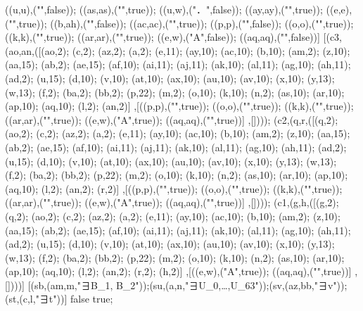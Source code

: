 ((u,u),("\mrot{\iterstar{i∈[0\upto32)\uplusminus{\tt i}}．{}\\{} \smallbin{i}{U_i}}",false)); ((as,as),("",true)); ((u,w),("．",false)); ((ay,ay),("",true)); ((e,e),("",true)); ((b,ah),("",false)); ((ac,ac),("",true)); ((p,p),("",false)); ((o,o),("\mrot{{\tt rsize}\partialdiv 8 ∈ [2\upto32)}",true)); ((k,k),("",true)); ((ar,ar),("",true)); ((e,w),("\state A",false)); ((aq,aq),("",false))] [(c3,(ao,an,([(ao,2); (c,2); (az,2); (a,2); (e,11); (ay,10); (ac,10); (b,10); (am,2); (z,10); (aa,15); (ab,2); (ae,15); (af,10); (ai,11); (aj,11); (ak,10); (al,11); (ag,10); (ah,11); (ad,2); (u,15); (d,10); (v,10); (at,10); (ax,10); (au,10); (av,10); (x,10); (y,13); (w,13); (f,2); (ba,2); (bb,2); (p,22); (m,2); (o,10); (k,10); (n,2); (as,10); (ar,10); (ap,10); (aq,10); (l,2); (an,2)] ,[((p,p),("\mrot{∀i∈[0\upto32-{\tt idx})．{}\\{}{\tt smallbits}_{[i]} = {}\\{} {\tt smallmap}_{[i+{\tt idx}]}}",true)); ((o,o),("",true)); ((k,k),("",true)); ((ar,ar),("",true)); ((e,w),("\state A",true)); ((aq,aq),("",true))] ,[]))); (c2,(q,r,([(q,2); (ao,2); (c,2); (az,2); (a,2); (e,11); (ay,10); (ac,10); (b,10); (am,2); (z,10); (aa,15); (ab,2); (ae,15); (af,10); (ai,11); (aj,11); (ak,10); (al,11); (ag,10); (ah,11); (ad,2); (u,15); (d,10); (v,10); (at,10); (ax,10); (au,10); (av,10); (x,10); (y,13); (w,13); (f,2); (ba,2); (bb,2); (p,22); (m,2); (o,10); (k,10); (n,2); (as,10); (ar,10); (ap,10); (aq,10); (l,2); (an,2); (r,2)] ,[((p,p),("\mrot{∀i∈[0\upto32-{\tt idx})．{}\\{}{\tt smallbits}_{[i]} = {}\\{} {\tt smallmap}_{[i+{\tt idx}]}}",true)); ((o,o),("",true)); ((k,k),("",true)); ((ar,ar),("",true)); ((e,w),("\state A",true)); ((aq,aq),("",true))] ,[]))); (c1,(g,h,([(g,2); (q,2); (ao,2); (c,2); (az,2); (a,2); (e,11); (ay,10); (ac,10); (b,10); (am,2); (z,10); (aa,15); (ab,2); (ae,15); (af,10); (ai,11); (aj,11); (ak,10); (al,11); (ag,10); (ah,11); (ad,2); (u,15); (d,10); (v,10); (at,10); (ax,10); (au,10); (av,10); (x,10); (y,13); (w,13); (f,2); (ba,2); (bb,2); (p,22); (m,2); (o,10); (k,10); (n,2); (as,10); (ar,10); (ap,10); (aq,10); (l,2); (an,2); (r,2); (h,2)] ,[((e,w),("\state A",true)); ((aq,aq),("",true))] ,[])))] [(sb,(am,m,"∃B_1, B_2"));(su,(a,n,"∃U_0,\ldots,U_{63}"));(sv,(az,bb,"∃v"));(st,(c,l,"∃t"))] false true;
